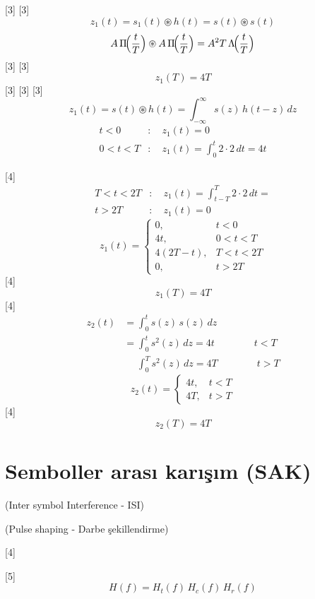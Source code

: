 \documentclass[11pt,a4paper]{article}
\begin{document}
[3]
[3]
\[
z_1(t)=s_1(t)\circledast h(t)=s(t)\circledast s(t)
\]
\[
A\,\Pi\!\Bigl(\frac{t}{T}\Bigr)\circledast A\,\Pi\!\Bigl(\frac{t}{T}\Bigr)=A^2T\,\Lambda\!\Bigl(\frac{t}{T}\Bigr)
\]
[3]
[3]
\[
z_1(T)=4T
\]
[3]
[3]
[3]
\[
z_1(t)=s(t)\circledast h(t)=\int_{-\infty}^{\infty}s(z)\,h(t-z)\,dz
\]
\begin{align*}
t<0&:\quad z_1(t)=0\\
0<t<T&:\quad z_1(t)=\int_0^t 2\cdot 2\,dt=4t
\end{align*}

[4]
\begin{align*}
T<t<2T&:\quad z_1(t)=\int_{t-T}^{T}2\cdot 2\,dt=\\
t>2T&:\quad z_1(t)=0
\end{align*}
\[
z_1(t)=\begin{cases}
0, & t<0\\
4t, & 0<t<T\\
4(2T-t), & T<t<2T\\
0, & t>2T
\end{cases}
\]
[4]
\[
z_1(T)=4T
\]
[4]
\begin{align*}
z_2(t)&=\int_0^t s(z)\,s(z)\,dz\\
&=\int_0^t s^2(z)\,dz=4t\qquad\qquad t<T\\
&\phantom{=}\int_0^T s^2(z)\,dz=4T\qquad\qquad t>T
\end{align*}
\[
z_2(t)=\begin{cases}
4t, & t<T\\
4T, & t>T
\end{cases}
\]
[4]
\[
z_2(T)=4T
\]
\section{Semboller arası karışım (SAK)}
(Inter symbol Interference - ISI)

(Pulse shaping - Darbe şekillendirme)

[4]

[5]
\[
H(f)=H_t(f)\,H_c(f)\,H_r(f)
\]
\end{document}
